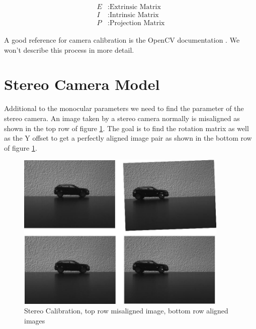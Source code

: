 \documentclass[11pt,a4paper,titlepage,oneside]{report}
\begin{document}
\begin{align*}
	E		&: \text{Extrinsic Matrix}\\
	I		&: \text{Intrinsic Matrix}\\
	P		&: \text{Projection Matrix}
\end{align*}

A good reference for camera calibration is the OpenCV documentation \cite{opencv_calib}. We won't describe this process in more detail.

\section{Stereo Camera Model}

Additional to the monocular parameters we need to find the parameter of the stereo camera. An image taken by a stereo camera normally is misaligned as shown in the top row of figure \ref{fig:stereo_calib}. The goal is to find the rotation matrix as well as the Y offset to get a perfectly aligned image pair as shown in the bottom row of figure \ref{fig:stereo_calib}.

\begin{figure}[H]
  \begin{center}
		\includegraphics[width=0.9\textwidth]{img/car_calib.jpg}
  \end{center}
	\caption{Stereo Calibration, top row misaligned image, bottom row aligned images}\label{fig:stereo_calib}
\end{figure}
\end{document}
